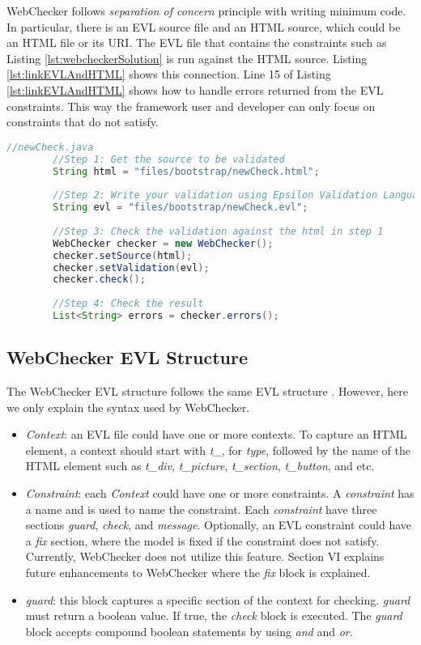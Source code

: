 \documentclass[conference]{IEEETran}
\begin{document}
WebChecker follows \textit{separation of concern} principle with writing minimum code. In particular, there is an EVL source file and an HTML source, which could be an HTML file or its URI. The EVL file that contains the constraints such as Listing \ref{lst:webcheckerSolution} is run against the HTML source. Listing \ref{lst:linkEVLAndHTML} shows this connection. Line 15 of Listing \ref{lst:linkEVLAndHTML} shows how to handle errors returned from the EVL constraints. This way the framework user and developer can only focus on constraints that do not satisfy.   

\begin{lstlisting}[language=Java, caption=Checking an EVL file against an HTML source file, label={lst:linkEVLAndHTML}]
 	//newCheck.java    
		//Step 1: Get the source to be validated
		String html = "files/bootstrap/newCheck.html";
		
		//Step 2: Write your validation using Epsilon Validation Language
		String evl = "files/bootstrap/newCheck.evl";
		
		//Step 3: Check the validation against the html in step 1
		WebChecker checker = new WebChecker();
		checker.setSource(html);
		checker.setValidation(evl);
		checker.check();
		
		//Step 4: Check the result
		List<String> errors = checker.errors();


\end{lstlisting}

\subsection{WebChecker EVL Structure}
The WebChecker EVL structure follows the same EVL structure \cite{Kolovos2009}. However, here we only explain the syntax used by WebChecker. 
\begin{itemize}
\item \textit{Context}: an EVL file could have one or more contexts. To capture an HTML element, a context should start with \textit{t\_}, for \textit{type}, followed by the name of the HTML element such as \textit{t\_div}, \textit{t\_picture}, \textit{t\_section}, \textit{t\_button}, and etc.
\item \textit{Constraint}: each \textit{Context} could have one or more constraints. A \textit{constraint} has a name and is used to name the constraint. Each \textit{constraint} have three sections \textit{guard}, \textit{check}, and \textit{message}. Optionally, an EVL constraint could have a \textit{fix} section, where the model is fixed if the constraint does not satisfy. Currently, WebChecker does not utilize this feature. Section VI explains future enhancements to WebChecker where the \textit{fix} block is explained. 
\item \textit{guard}: this block captures a specific section of the context for checking. \textit{guard} must return a boolean value. If true, the \textit{check} block is executed. The \textit{guard} block accepts compound boolean statements by using \textit{and} and \textit{or}.      
\end{itemize}
\end{document}
